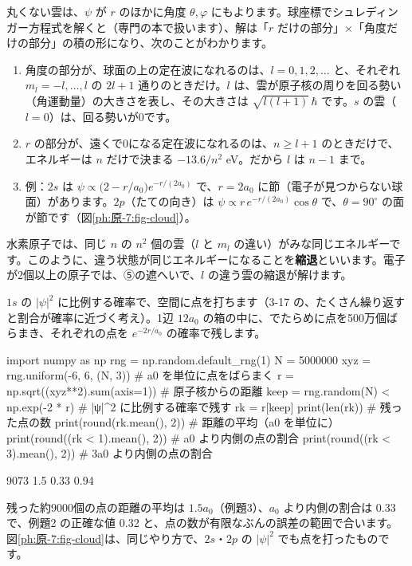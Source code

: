 丸くない雲は、$\psi$ が $r$ のほかに角度 $\theta,\varphi$ にもよります。球座標でシュレディンガー方程式を解くと（専門の本で扱います）、解は「$r$ だけの部分」×「角度だけの部分」の積の形になり、次のことがわかります。
\begin{enumerate}[label={\bkcircled{\arabic*}}, leftmargin=2.4\zw, itemsep=1pt, topsep=2pt]
\item 角度の部分が、球面の上の定在波になれるのは、$l=0,1,2,\ldots$ と、それぞれ $m_l=-l,\ldots,l$ の $2l+1$ 通りのときだけ。$l$ は、雲が原子核の周りを回る勢い（角運動量）の大きさを表し、その大きさは $\sqrt{l(l+1)}\,\hbar$ です。$s$ の雲（$l=0$）は、回る勢いが0です。
\item $r$ の部分が、遠くで0になる定在波になれるのは、$n\ge l+1$ のときだけで、エネルギーは $n$ だけで決まる $-13.6/n^2$ eV。だから $l$ は $n-1$ まで。
\item 例：$2s$ は $\psi\propto\bigl(2-r/a_0\bigr)e^{-r/(2a_0)}$ で、$r=2a_0$ に節（電子が見つからない球面）があります。$2p$（たての向き）は $\psi\propto r\,e^{-r/(2a_0)}\cos\theta$ で、$\theta=90^\circ$ の面が節です（図\ref{ph:原-7:fig-cloud}）。
\end{enumerate}
水素原子では、同じ $n$ の $n^2$ 個の雲（$l$ と $m_l$ の違い）がみな同じエネルギーです。このように、違う状態が同じエネルギーになることを\textbf{縮退}といいます。電子が2個以上の原子では、⑤の遮へいで、$l$ の違う雲の縮退が解けます。

$1s$ の $|\psi|^2$ に比例する確率で、空間に点を打ちます（3-17 の、たくさん繰り返すと割合が確率に近づく考え）。1辺 $12a_0$ の箱の中に、でたらめに点を500万個ばらまき、それぞれの点を $e^{-2r/a_0}$ の確率で残します。
\begin{phcode}[Python]
import numpy as np
rng = np.random.default\_rng(1)
N = 5000000
xyz = rng.uniform(-6, 6, (N, 3))         \# a0 を単位に点をばらまく
r = np.sqrt((xyz**2).sum(axis=1))        \# 原子核からの距離
keep = rng.random(N) < np.exp(-2 * r)    \# |ψ|\textasciicircum2 に比例する確率で残す
rk = r[keep]
print(len(rk))                           \# 残った点の数
print(round(rk.mean(), 2))               \# 距離の平均（a0 を単位に）
print(round((rk < 1).mean(), 2))         \# a0 より内側の点の割合
print(round((rk < 3).mean(), 2))         \# 3a0 より内側の点の割合
\end{phcode}
\begin{phcodeout}[実行結果]
9073
1.5
0.33
0.94
\end{phcodeout}
残った約9000個の点の距離の平均は $1.5a_0$（例題3）、$a_0$ より内側の割合は 0.33 で、例題2 の正確な値 0.32 と、点の数が有限なぶんの誤差の範囲で合います。図\ref{ph:原-7:fig-cloud}は、同じやり方で、$2s$・$2p$ の $|\psi|^2$ でも点を打ったものです。

